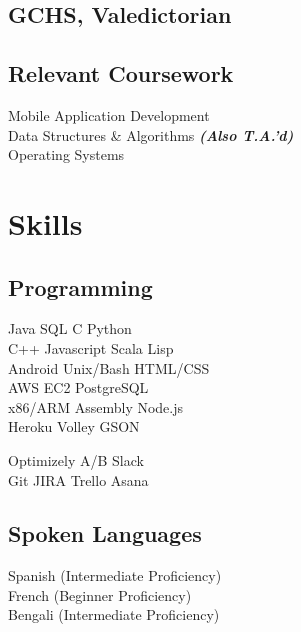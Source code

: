 \documentclass[]{deedy-resume-openfont}
\begin{document}
\begin{minipage}[t]{0.31\textwidth}
\subsection{GCHS, Valedictorian}
\sectionsep

\subsection{Relevant Coursework}
Mobile Application Development\\
Data Structures \& Algorithms
{\footnotesize \textit{\textbf{(Also T.A.'d) }}} \\
Operating Systems
\\[1\baselineskip]

\section{Skills}
\subsection{Programming}

Java \textbullet{}  SQL  \textbullet{} C \textbullet{} Python
\\[1\baselineskip]

C++  \textbullet{} Javascript \textbullet{} Scala \textbullet{}   Lisp
\\[1\baselineskip]

Android  \textbullet{}  Unix/Bash \textbullet{} HTML/CSS \\
\textbullet{} AWS EC2 \textbullet{} PostgreSQL
\\[1\baselineskip]

x86/ARM Assembly \textbullet{}  Node.js \\
\textbullet{}  Heroku \textbullet{} Volley \textbullet{} GSON 
\sectionsep

Optimizely A/B \textbullet{}  Slack \\
\textbullet{}  Git \textbullet{}  JIRA \textbullet{}  Trello \textbullet{}  Asana
\sectionsep

\subsection{Spoken Languages}
Spanish (Intermediate Proficiency) \\
French (Beginner Proficiency)\\
Bengali (Intermediate Proficiency)\\
[1\baselineskip]


\end{minipage}
\end{document}
